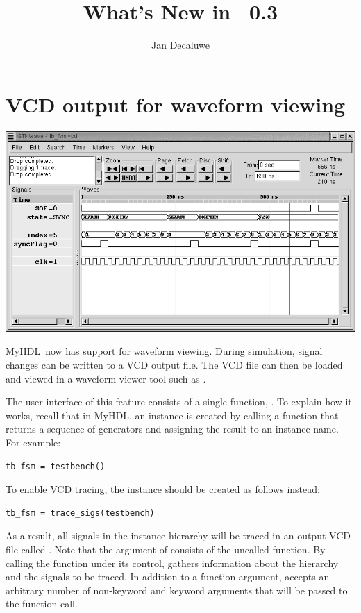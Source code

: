 \documentclass{howto}
\title{What's New in \myhdl\ 0.3}
\author{Jan Decaluwe}
\newcommand{\myhdl}{\protect \mbox{MyHDL}}
\begin{document}
\maketitle
\tableofcontents


\section{VCD output for waveform viewing\label{section-wave}}

\ifpdf
\includegraphics{tbfsm.png}
\fi

\myhdl\ now has support for waveform viewing. During simulation, signal
changes can be written to a VCD output file.  The VCD file can then be
loaded and viewed in a waveform viewer tool such as .

The user interface of this feature consists of a single function,
.  To explain how it works, recall that in
\myhdl{}, an instance is created by calling a function that returns a
sequence of generators and assigning the result to an instance
name. For example:

\begin{verbatim}
tb_fsm = testbench()
\end{verbatim}

To enable VCD tracing, the instance should be created as follows
instead:

\begin{verbatim}
tb_fsm = trace_sigs(testbench)
\end{verbatim}

As a result, all signals in the instance hierarchy will be traced in
an output VCD file called . Note that the argument of
 consists of the uncalled function. By calling
the function under its control,  gathers
information about the hierarchy and the signals to be traced.  In
addition to a function argument,  accepts an
arbitrary number of non-keyword and keyword arguments that will be
passed to the function call.
\end{document}
